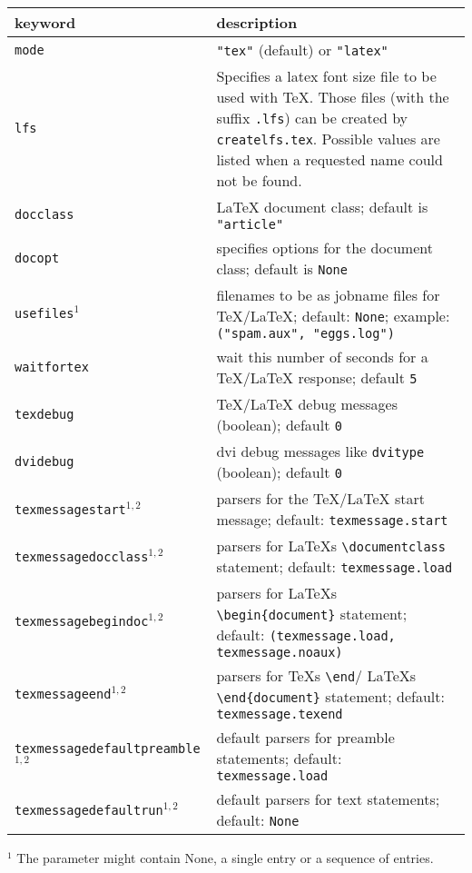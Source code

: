 \medskip
\begin{tabularx}{\linewidth}{l>{\raggedright\arraybackslash}X}
keyword&description\\
\hline
\texttt{mode}&\texttt{"tex"} (default) or \texttt{"latex"}\\
\texttt{lfs}&Specifies a latex font size file to be used with \TeX. Those files (with the suffix \texttt{.lfs}) can be created by \texttt{createlfs.tex}. Possible values are listed when a requested name could not be found.\\
\texttt{docclass}&\LaTeX{} document class; default is \texttt{"article"}\\
\texttt{docopt}&specifies options for the document class; default is \texttt{None}\\
\texttt{usefiles}$^1$&filenames to be as jobname files for \TeX/\LaTeX{}; default: \texttt{None}; example: \texttt{("spam.aux", "eggs.log")}\\
\texttt{waitfortex}&wait this number of seconds for a \TeX/\LaTeX{} response; default \texttt{5}\\
\texttt{texdebug}&\TeX/\LaTeX{} debug messages (boolean); default \texttt{0}\\
\texttt{dvidebug}&dvi debug messages like \texttt{dvitype} (boolean); default \texttt{0}\\
\texttt{texmessagestart}$^{1,2}$&parsers for the \TeX/\LaTeX{} start message; default: \texttt{texmessage.start}\\
\texttt{texmessagedocclass}$^{1,2}$&parsers for \LaTeX{}s \texttt{\textbackslash{}documentclass} statement; default: \texttt{texmessage.load}\\
\texttt{texmessagebegindoc}$^{1,2}$&parsers for \LaTeX{}s \texttt{\textbackslash{}begin\{document\}} statement; default: \texttt{(texmessage.load, texmessage.noaux)}\\
\texttt{texmessageend}$^{1,2}$&parsers for \TeX{}s \texttt{\textbackslash{}end}/ \LaTeX{}s \texttt{\textbackslash{}end\{document\}} statement; default: \texttt{texmessage.texend}\\
\texttt{texmessagedefaultpreamble}$^{1,2}$&default parsers for preamble statements; default: \texttt{texmessage.load}\\
\texttt{texmessagedefaultrun}$^{1,2}$&default parsers for text statements; default: \texttt{None}\\
\end{tabularx}
\medskip

$^1$
The parameter might contain None, a single entry or a sequence of entries.

